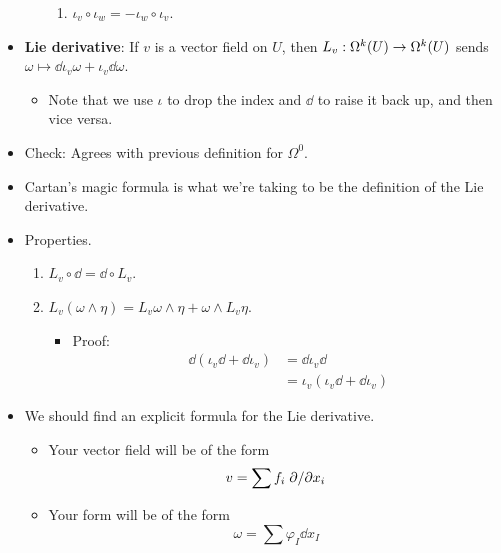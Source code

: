 \documentclass[../notes.tex]{subfiles}
\begin{document}
\begin{itemize}
\begin{itemize}
\begin{enumerate}
            \item $\iota_v\circ\iota_w=-\iota_w\circ\iota_v$.
        \end{enumerate}
    \end{itemize}
    \item \textbf{Lie derivative}: If $v$ is a vector field on $U$, then $L_v:\ome[k]{U}\to\ome[k]{U}$ sends $\omega\mapsto\dd{\iota_v\omega}+\iota_v\dd{\omega}$.
    \begin{itemize}
        \item Note that we use $\iota$ to drop the index and $\dd$ to raise it back up, and then vice versa.
    \end{itemize}
    \item Check: Agrees with previous definition for $\Omega^0$.
    \item Cartan's magic formula is what we're taking to be the definition of the Lie derivative.
    \item Properties.
    \begin{enumerate}
        \item $L_v\circ\dd=\dd\circ L_v$.
        \item $L_v(\omega\wedge\eta)=L_v\omega\wedge\eta+\omega\wedge L_v\eta$.
        \begin{itemize}
            \item Proof:
            \begin{align*}
                \dd(\iota_v\dd+\dd\iota_v) &= \dd\iota_v\dd\\
                &= \iota_v(\iota_v\dd+\dd\iota_v)
            \end{align*}
        \end{itemize}
    \end{enumerate}
    \item We should find an explicit formula for the Lie derivative.
    \begin{itemize}
        \item Your vector field will be of the form
        \begin{equation*}
            v = \sum f_i\pdv*{x_i}
        \end{equation*}
        \item Your form will be of the form
        \begin{equation*}
            \omega = \sum\varphi_I\dd{x_I}
        \end{equation*}
    \end{itemize}
\end{itemize}
\end{document}
